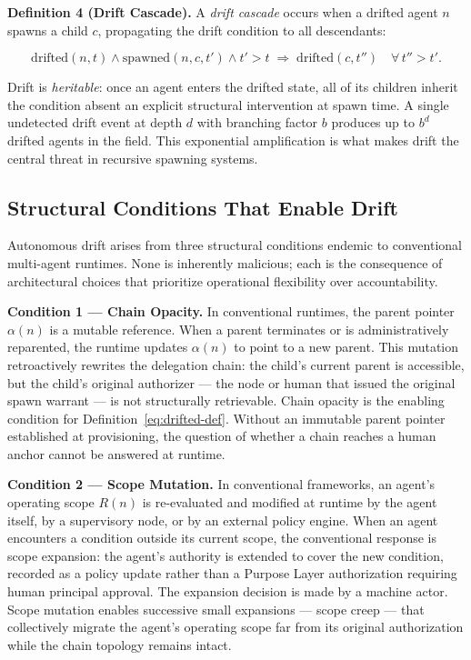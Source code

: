 \medskip
\noindent\textbf{Definition 4 (Drift Cascade).}
A \emph{drift cascade} occurs when a drifted agent $n$ spawns a child $c$, propagating the drift condition to all descendants:

\begin{equation}
\mathrm{drifted}(n, t) \land \mathrm{spawned}(n, c, t') \land t' > t \;\Longrightarrow\; \mathrm{drifted}(c, t'')\quad \forall\, t'' > t'.
\label{eq:drift-cascade}
\end{equation}

Drift is \emph{heritable}: once an agent enters the drifted state, all of its children inherit the condition absent an explicit structural intervention at spawn time. A single undetected drift event at depth $d$ with branching factor $b$ produces up to $b^d$ drifted agents in the field. This exponential amplification is what makes drift the central threat in recursive spawning systems.

\subsection{Structural Conditions That Enable Drift}
\label{sec:drift-conditions}

Autonomous drift arises from three structural conditions endemic to conventional multi-agent runtimes. None is inherently malicious; each is the consequence of architectural choices that prioritize operational flexibility over accountability.

\medskip
\noindent\textbf{Condition 1 — Chain Opacity.}
In conventional runtimes, the parent pointer $\alpha(n)$ is a mutable reference. When a parent terminates or is administratively reparented, the runtime updates $\alpha(n)$ to point to a new parent. This mutation retroactively rewrites the delegation chain: the child's current parent is accessible, but the child's original authorizer — the node or human that issued the original spawn warrant — is not structurally retrievable. Chain opacity is the enabling condition for Definition~\ref{eq:drifted-def}. Without an immutable parent pointer established at provisioning, the question of whether a chain reaches a human anchor cannot be answered at runtime.

\medskip
\noindent\textbf{Condition 2 — Scope Mutation.}
In conventional frameworks, an agent's operating scope $R(n)$ is re-evaluated and modified at runtime by the agent itself, by a supervisory node, or by an external policy engine. When an agent encounters a condition outside its current scope, the conventional response is scope expansion: the agent's authority is extended to cover the new condition, recorded as a policy update rather than a Purpose Layer authorization requiring human principal approval. The expansion decision is made by a machine actor. Scope mutation enables successive small expansions — scope creep — that collectively migrate the agent's operating scope far from its original authorization while the chain topology remains intact.

